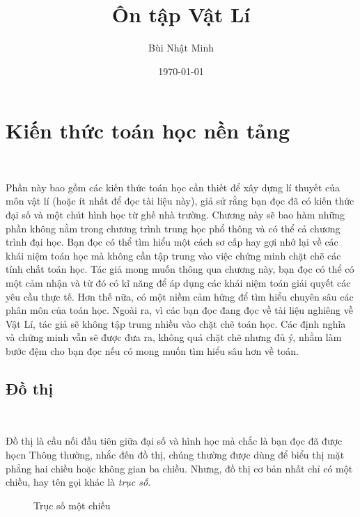 \documentclass[a4paper, titlepage, openany]{book}
\title{\Huge Ôn tập Vật Lí}
\author{Bùi Nhật Minh}
\date{\today}
\begin{document}
\maketitle

\setcounter{chapter}{-1}
\tableofcontents

\chapter{Kiến thức toán học nền tảng}

\ %

Phần này bao gồm các kiến thức toán học cần thiết để xây dựng lí thuyết của môn vật lí (hoặc ít nhất để đọc tài liệu này), giả sử rằng bạn đọc đã có kiến thức đại số và một chút hình học từ ghế nhà trường. Chương này sẽ bao hàm những phần không nằm trong chương trình trung học phổ thông và có thể cả chương trình đại học. Bạn đọc có thể tìm hiểu một cách sơ cấp hay gợi nhớ lại về các khái niệm toán học mà không cần tập trung vào việc chứng minh chặt chẽ các tính chất toán học. Tác giả mong muốn thông qua chương này, bạn đọc có thể có một cảm nhận và từ đó có kĩ năng để áp dụng các khái niệm toán giải quyết các yêu cầu thực tế. Hơn thế nữa, có một niềm cảm hứng để tìm hiểu chuyên sâu các phân môn của toán học. Ngoài ra, vì các bạn đọc đang đọc về tài liệu nghiêng về Vật Lí, tác giả sẽ không tập trung nhiều vào chặt chẽ toán học. Các định nghĩa và chứng minh vẫn sẽ được đưa ra, không quá chặt chẽ nhưng đủ ý, nhằm làm bước đệm cho bạn đọc nếu có mong muốn tìm hiểu sâu hơn về toán.

\section{Đồ thị}

\ %

Đồ thị là cầu nối đầu tiên giữa đại số và hình học mà chắc là bạn đọc đã được họcn Thông thường, nhắc đến đồ thị, chúng thường được dùng để biểu thị mặt phẳng hai chiều hoặc không gian ba chiều. Nhưng, đồ thị cơ bản nhất chỉ có một chiều, hay tên gọi khác là \emph{trục số}. 

\def \pointSize {1.5pt}

\begin{wrapfigure}{r}{0.4\textwidth}
   \centering
   \caption{Trục số một chiều}
   \label{fig:truc so mot chieu}
\end{wrapfigure}
\end{document}

